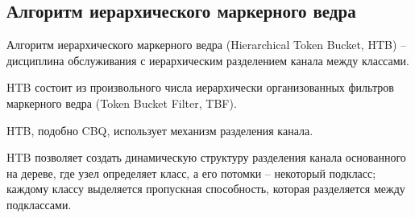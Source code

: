     \subsection{Алгоритм иерархического маркерного ведра}

        Алгоритм иерархического маркерного ведра (Hierarchical Token Bucket, HTB) -- дисциплина
        обслуживания с иерархическим разделением канала между классами.

	


		HTB состоит из произвольного числа иерархически организованных фильтров маркерного
        ведра (Token Bucket Filter, TBF). \cite{packethandling}

		HTB, подобно CBQ, использует механизм разделения канала. 

		HTB позволяет создать динамическую структуру разделения
		канала основанного на дереве, где узел определяет класс,
		а его потомки -- некоторый подкласс; каждому классу
		выделяется пропускная способность, которая разделяется
		между подклассами.

%


%		
%
%

